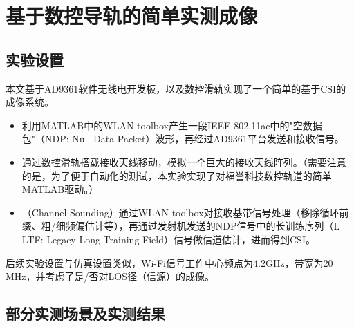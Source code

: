 \section{基于数控导轨的简单实测成像}
\subsection{实验设置}
本文基于AD9361软件无线电开发板，以及数控滑轨实现了一个简单的基于CSI的成像系统。
\begin{itemize}
  \item 利用MATLAB中的WLAN toolbox\cite{wlantoolbox}产生一段IEEE 802.11ac\cite{ong2011ieee}中的"空数据包"（NDP: Null Data Packet）波形\cite{perahia2013next}，再经过AD9361平台发送和接收信号。
  \item 通过数控滑轨搭载接收天线移动，模拟一个巨大的接收天线阵列。（需要注意的是，为了便于自动化的测试，本实验实现了对福誉科技数控轨道\cite{fuyu}的简单MATLAB驱动。）
  \item （Channel Sounding）通过WLAN toolbox对接收基带信号处理（移除循环前缀、粗/细频偏估计等），再通过发射机发送的NDP信号中的长训练序列（L-LTF: Legacy-Long Training Field）信号做信道估计，进而得到CSI\cite{ma2019wifi}\cite{perahia2013next}。
\end{itemize}
后续实验设置与仿真设置类似，Wi-Fi信号工作中心频点为$4.2$GHz，带宽为$20$MHz，并考虑了是/否对LOS径（信源）的成像。
\subsection{部分实测场景及实测结果}
